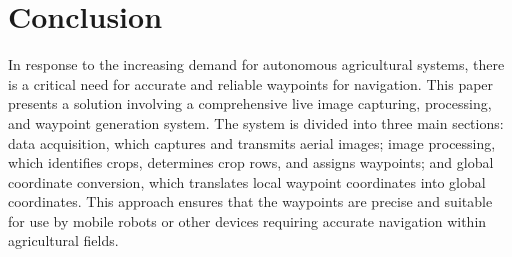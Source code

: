 \documentclass[conference]{IEEEtran}
\begin{document}
\section{Conclusion}
In response to the increasing demand for autonomous agricultural systems, there is a critical need for accurate and reliable waypoints for navigation. This paper presents a solution involving a comprehensive live image capturing, processing, and waypoint generation system. The system is divided into three main sections: data acquisition, which captures and transmits aerial images; image processing, which identifies crops, determines crop rows, and assigns waypoints; and global coordinate conversion, which translates local waypoint coordinates into global coordinates. This approach ensures that the waypoints are precise and suitable for use by mobile robots or other devices requiring accurate navigation within agricultural fields.
\end{document}
